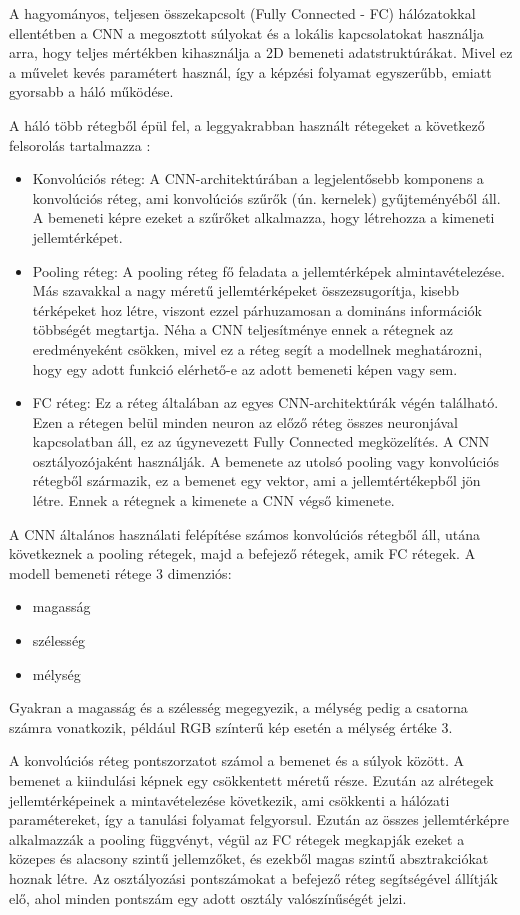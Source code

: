 A hagyományos, teljesen összekapcsolt (Fully Connected - FC) hálózatokkal ellentétben a CNN a megosztott súlyokat és a lokális kapcsolatokat használja arra, hogy teljes mértékben kihasználja a 2D bemeneti adatstruktúrákat. Mivel ez a művelet kevés paramétert használ, így a képzési folyamat egyszerűbb, emiatt gyorsabb a háló működése.\cite{cnn}

A háló több rétegből épül fel, a leggyakrabban használt rétegeket a következő felsorolás tartalmazza \cite{cnn}:
\begin{itemize}
\item Konvolúciós réteg: A CNN-architektúrában a legjelentősebb komponens a konvolúciós réteg, ami konvolúciós szűrők (ún. kernelek) gyűjteményéből áll. A bemeneti képre ezeket a szűrőket alkalmazza, hogy létrehozza a kimeneti jellemtérképet.
\item Pooling réteg: A pooling réteg fő feladata a jellemtérképek almintavételezése. Más szavakkal a nagy méretű jellemtérképeket összezsugorítja, kisebb térképeket hoz létre, viszont ezzel párhuzamosan a domináns információk többségét megtartja. Néha a CNN teljesítménye ennek a rétegnek az eredményeként csökken, mivel ez a réteg segít a modellnek meghatározni, hogy egy adott funkció elérhető-e az adott bemeneti képen vagy sem.
\item FC réteg: Ez a réteg általában az egyes CNN-architektúrák végén található. Ezen a rétegen belül minden neuron az előző réteg összes neuronjával kapcsolatban áll, ez az úgynevezett Fully Connected megközelítés. A CNN osztályozójaként használják. A bemenete az utolsó pooling vagy konvolúciós rétegből származik, ez a bemenet egy vektor, ami a jellemtértékepből jön létre. Ennek a rétegnek a kimenete a CNN végső kimenete.
\end{itemize}

A CNN általános használati felépítése számos konvolúciós rétegből áll, utána következnek a pooling rétegek, majd a befejező rétegek, amik FC rétegek. A modell bemeneti rétege 3 dimenziós:
\begin{itemize}
\item magasság
\item szélesség
\item mélység
\end{itemize}
Gyakran a magasság és a szélesség megegyezik, a mélység pedig a csatorna számra vonatkozik, például RGB színterű kép esetén a mélység értéke 3.

A konvolúciós réteg pontszorzatot számol a bemenet és a súlyok között. A bemenet a kiindulási képnek egy csökkentett méretű része. Ezután az alrétegek jellemtérképeinek a mintavételezése következik, ami csökkenti a hálózati paramétereket, így a tanulási folyamat felgyorsul. Ezután az összes jellemtérképre alkalmazzák a pooling függvényt, végül az FC rétegek megkapják ezeket a közepes és alacsony szintű jellemzőket, és ezekből magas szintű absztrakciókat hoznak létre. Az osztályozási pontszámokat a befejező réteg segítségével állítják elő, ahol minden pontszám egy adott osztály valószínűségét jelzi. \cite{cnn}

